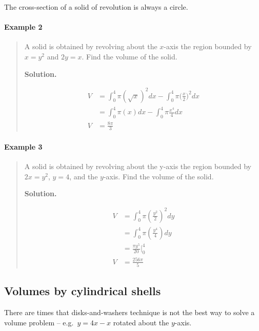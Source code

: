 \documentclass[
]{article}
\begin{document}
The cross-section of a solid of revolution is always a circle.

\hypertarget{example-2-3}{%
\paragraph*{Example 2}\label{example-2-3}}

\begin{quote}
A solid is obtained by revolving about the \(x\)-axis the region bounded
by \(x=y^2\) and \(2y=x\). Find the volume of the solid.

\textbf{Solution.}

\begin{align*}
V &= \int_0^4 \pi(\sqrt{x})^2 dx - \int_0^4 \pi\Big(\frac{x}{2}\Big)^2 dx \\
&= \int_0^4 \pi (x) dx - \int_0^4 \pi \frac{x^4}{4} dx \\
V &= \frac{8\pi}{3}
\end{align*}
\end{quote}

\hypertarget{example-3-2}{%
\paragraph*{Example 3}\label{example-3-2}}

\begin{quote}
A solid is obtained by revolving about the y-axis the region bounded by
\(2x=y^2\), \(y=4\), and the \(y\)-axis. Find the volume of the solid.

\textbf{Solution.}

\begin{align*}
V &= \int_0^4 \pi (\frac{y^2}{2})^2 dy \\
&= \int_0^4 \pi (\frac{y^4}{4}) dy \\
&= \frac{\pi y^5}{20} \Bigg|_0^4 \\
V &= \frac{256\pi}{5}
\end{align*}
\end{quote}

\hypertarget{volumes-by-cylindrical-shells}{%
\subsection{Volumes by cylindrical
shells}\label{volumes-by-cylindrical-shells}}

There are times that disks-and-washers technique is not the best way to
solve a volume problem -- e.g.~\(y = 4x-x\) rotated about the
\(y\)-axis.
\end{document}
